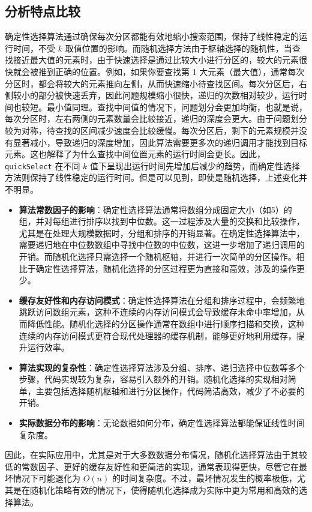 \subsection{分析特点比较}
确定性选择算法通过确保每次分区都能有效地缩小搜索范围，保持了线性稳定的运行时间，不受 $k$ 取值位置的影响。而随机选择方法由于枢轴选择的随机性，当查找接近最大值的元素时，由于快速选择是通过比较大小进行分区的，较大的元素很快就会被推到正确的位置。例如，如果你要查找第 1 大元素（最大值），通常每次分区时，都会将较大的元素推向左侧，从而快速缩小待查找区间。每次分区后，右侧较小的部分被快速丢弃，因此问题规模缩小很快，递归的次数相对较少，运行时间也较短。最小值同理。查找中间值的情况下，问题划分会更加均衡，也就是说，每次分区时，左右两侧的元素数量会比较接近，递归的深度会更大。由于问题划分较为对称，待查找的区间减少速度会比较缓慢。每次分区后，剩下的元素规模并没有显著减小，导致递归的深度增加，因此算法需要更多次的递归调用才能找到目标元素。这也解释了为什么查找中间位置元素的运行时间会更长。因此，\texttt{quickSelect} 在不同 $k$ 值下呈现出运行时间先增加后减少的趋势，而确定性选择方法则保持了线性稳定的运行时间。但是可以见到，即使是随机选择，上述变化并不明显。
\begin{itemize}
    \item \textbf{算法常数因子的影响}：确定性选择算法通常将数组分成固定大小（如5）的组，并对每组进行排序以找到中位数。这一过程涉及大量的交换和比较操作，尤其是在处理大规模数据时，分组和排序的开销显著。在确定性选择算法中，需要递归地在中位数数组中寻找中位数的中位数，这进一步增加了递归调用的开销。而随机化选择只需选择一个随机枢轴，并进行一次简单的分区操作。相比于确定性选择算法，随机化选择的分区过程更为直接和高效，涉及的操作更少。
    \item \textbf{缓存友好性和内存访问模式}：确定性选择算法在分组和排序过程中，会频繁地跳跃访问数组元素，这种不连续的内存访问模式会导致缓存未命中率增加，从而降低性能。随机化选择的分区操作通常在数组中进行顺序扫描和交换，这种连续的内存访问模式更符合现代处理器的缓存机制，能够更好地利用缓存，提升运行效率。
    \item \textbf{算法实现的复杂性}：确定性选择算法涉及分组、排序、递归选择中位数等多个步骤，代码实现较为复杂，容易引入额外的开销。随机化选择的实现相对简单，主要包括选择随机枢轴和进行分区操作，代码简洁高效，减少了不必要的开销。
    \item \textbf{实际数据分布的影响}：无论数据如何分布，确定性选择算法都能保证线性时间复杂度。
\end{itemize}
因此，在实际应用中，尤其是对于大多数数据分布情况，随机化选择算法由于其较低的常数因子、更好的缓存友好性和更简洁的实现，通常表现得更快，尽管它在最坏情况下可能退化为 $O(n)$ 的时间复杂度。不过，最坏情况发生的概率极低，尤其是在随机化策略有效的情况下，使得随机化选择成为实际中更为常用和高效的选择算法。

